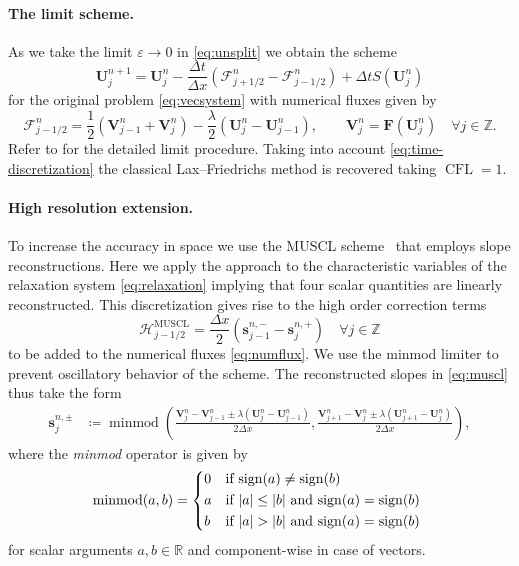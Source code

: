 \documentclass[a4paper,11pt]{article}
\newcommand{\R}{\mathbb{R}}
\newcommand{\Z}{\mathbb{Z}}
\newcommand{\minmod}{\operatorname{minmod}}
\newcommand{\CFL}{\operatorname{CFL}}
\newcommand{\sign}{\operatorname{sign}}
\begin{document}
\paragraph{The limit scheme.} As we take the limit $\varepsilon \to 0$ in \eqref{eq:unsplit} we obtain the scheme
\begin{equation}\label{eq:limitscheme}
  \mathbf U_j^{n+1} = \mathbf U_j^n - \frac{\Delta t}{\Delta x}\left( \mathcal F_{j+1/2}^n - \mathcal F_{j-1/2}^n \right) + \Delta t S(\mathbf U_j^n)
\end{equation}
for the original problem \eqref{eq:vecsystem} with numerical fluxes given by
\begin{equation}\label{eq:numflux}
  \mathcal F_{j-1/2}^n = \frac 1 2 \left( \mathbf V_{j-1}^n + \mathbf V_{j}^n \right) - \frac \lambda 2 \left( \mathbf U_j^n - \mathbf U_{j-1}^n \right), \qquad \mathbf V_j^n = \mathbf F (\mathbf U_j^n) \quad \forall j \in \Z.
\end{equation}
Refer to \cite{herty2023centrschemtwo} for the detailed limit procedure. Taking into account \eqref{eq:time-discretization} the classical Lax--Friedrichs method is recovered taking $\CFL=1$.

\paragraph{High resolution extension.}
To increase the accuracy in space we use the MUSCL scheme~\cite{leer1979towarultimconserdifferschem} that employs slope reconstructions. Here we apply the approach to the characteristic variables of the relaxation system \eqref{eq:relaxation} implying that four scalar quantities are linearly reconstructed. This discretization gives rise to the high order correction terms
\begin{equation}\label{eq:muscl}
\mathcal H_{j-1/2}^\text{MUSCL} = \frac{\Delta x}{2} (\mathbf s_{j-1}^{n,-} - \mathbf s_{j}^{n,+}) \quad \forall j \in \Z
\end{equation}
to be added to the numerical fluxes \eqref{eq:numflux}.
We use the minmod limiter to prevent oscillatory behavior of the scheme. The reconstructed slopes in \eqref{eq:muscl} thus take the form
\begin{align}
  \mathbf s_j^{n, \pm} &\coloneqq \minmod\left( \frac{\mathbf V_j^n  - \mathbf V_{j-1}^n \pm  \lambda (\mathbf U_j^n - \mathbf U_{j-1}^n)  }{2 \Delta x},
  \frac{\mathbf V_{j+1}^n - \mathbf V_j^n \pm \lambda (\mathbf U_{j+1}^n - \mathbf U_{j}^n)  }{2 \Delta x} \right),
\end{align}
where the \emph{minmod} operator is given by
\[
  \minmod(a,b) =
  \begin{cases*}
    0 & if $\sign(a) \neq \sign(b)$ \\
    a & if $|a| \leq |b|$ and $\sign(a) = \sign(b)$ \\
    b & if $|a| > |b|$ and $\sign(a) = \sign(b)$
  \end{cases*}
\]
for scalar arguments $a,b \in \R$ and component-wise in case of vectors.
\end{document}
